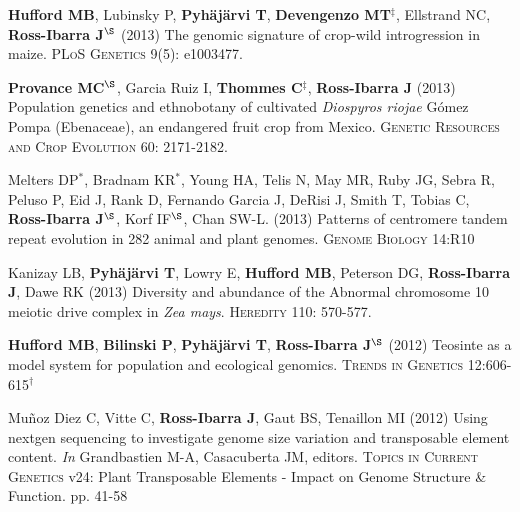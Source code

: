 \documentclass[letterpaper]{article}
\begin{document}
\begin{etaremune}
\item {\bf Hufford MB}, Lubinsky P, {\bf Pyh\"aj\"arvi T}, {\bf Devengenzo MT}$^\ddagger$, Ellstrand NC, {\bf Ross-Ibarra J}$^\S$ (2013) The genomic signature of crop-wild introgression in maize. \textsc{PLoS Genetics} 9(5): e1003477. %
\\%

\item {\bf Provance MC}$^\S$, Garcia Ruiz I, {\bf Thommes C}$^\ddagger$, {\bf Ross-Ibarra J} (2013) Population genetics and ethnobotany of cultivated \emph{Diospyros riojae} G\'omez Pompa (Ebenaceae), an endangered fruit crop from Mexico. \textsc{Genetic Resources and Crop Evolution} 60: 2171-2182.
\\%

\item Melters DP$^*$, Bradnam KR$^*$, Young HA, Telis N, May MR, Ruby JG, Sebra R, Peluso P, Eid J, Rank D, Fernando Garcia J, DeRisi J, Smith T, Tobias C, {\bf Ross-Ibarra J}$^\S$, Korf IF$^\S$, Chan SW-L. (2013) Patterns of centromere tandem repeat evolution in 282 animal and plant genomes. \textsc{Genome Biology} 14:R10 
\\%

\item Kanizay LB, {\bf Pyh\"aj\"arvi T}, Lowry E, {\bf Hufford MB}, Peterson DG, {\bf Ross-Ibarra J}, Dawe RK (2013) Diversity and abundance of the Abnormal chromosome 10 meiotic drive complex in \emph{Zea mays}. \textsc{Heredity} 110: 570-577.
\\%

\item {\bf Hufford MB}, {\bf Bilinski P}, {\bf Pyh\"aj\"arvi T}, {\bf Ross-Ibarra J}$^\S$ (2012) Teosinte as a model system for population and ecological genomics. \textsc{Trends in Genetics} 12:606-615$^\dagger$
\\%

\item Mu\~{n}oz Diez C, Vitte C, {\bf Ross-Ibarra J}, Gaut BS, Tenaillon MI (2012) Using nextgen sequencing to investigate genome size variation and transposable element content. \emph{In} Grandbastien M-A, Casacuberta JM, editors. \textsc{Topics in Current Genetics} v24: Plant Transposable Elements - Impact on Genome Structure \& Function. pp. 41-58 
\\%


\end{etaremune}
\end{document}
